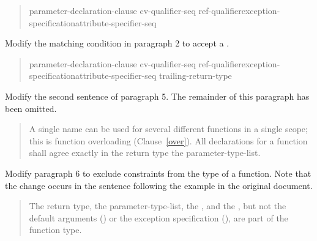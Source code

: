 \begin{quote}
\pnum
\begin{bnf}
 \terminal{(} parameter-declaration-clause \terminal{)} cv-qualifier-seq\opt\br
  \hspace*{\bnfindentinc}ref-qualifier\opt exception-specification\opt attribute-specifier-seq\opt\br
  \hspace*{\bnfindentinc}
\end{bnf}
\end{quote}

Modify the matching condition in paragraph 2 to accept a 
.

\begin{quote}
\pnum
\begin{bnf}
 \terminal{(} parameter-declaration-clause \terminal{)} cv-qualifier-seq\opt\br 
  \hspace*{\bnfindentinc}ref-qualifier\opt exception-specification\opt attribute-specifier-seq\opt\br
  \hspace*{\bnfindentinc}trailing-return-type 
\end{bnf}
\end{quote}


Modify the second sentence of paragraph 5. The remainder of this
paragraph has been omitted.

\begin{quote}
\setcounter{Paras}{4}
\pnum
A single name can be used for several different functions in a single 
scope; this is function overloading (Clause~\ref{over}). 
%
All declarations for a function shall agree exactly in  
the return type\added{,}  the parameter-type-list.
\end{quote}

Modify paragraph 6 to exclude constraints from the type of a function.
Note that the change occurs in the sentence following the example
in the original document.

\begin{quote}
\pnum
The return type, the parameter-type-list, the , 
and the , but not the default arguments
() or
the exception specification (), are part of the function 
type.
\end{quote}

